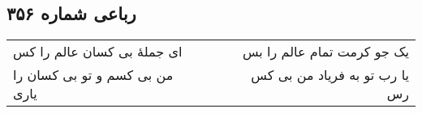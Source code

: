 \begin{center}
\section*{رباعی شماره ۳۵۶}
\label{sec:sh356}
\begin{longtable}{l p{0.5cm} r}
ای جملهٔ بی کسان عالم را کس
&&
یک جو کرمت تمام عالم را بس
\\
من بی کسم و تو بی کسان را یاری
&&
یا رب تو به فریاد من بی کس رس
\\
\end{longtable}
\end{center}
